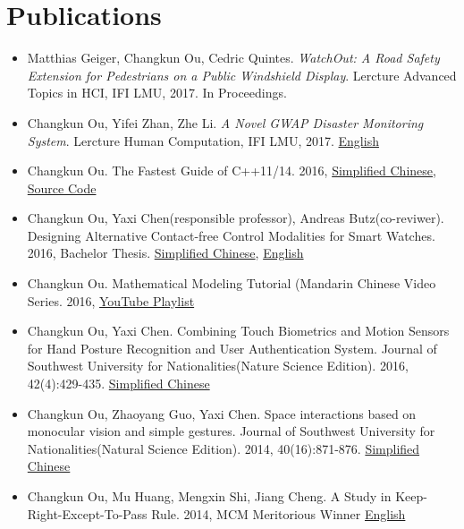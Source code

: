 \documentclass[letterpaper,11pt]{article}
\newcommand{\resumeSubHeadingListStart}{\begin{itemize}[leftmargin=*]}
\newcommand{\resumeSubHeadingListEnd}{\end{itemize}}
\begin{document}
\section{Publications}
 \resumeSubHeadingListStart
    \item{
      Matthias Geiger, Changkun Ou, Cedric Quintes.
      \emph{WatchOut: A Road Safety Extension for Pedestrians on a Public Windshield Display}.
      Lercture Advanced Topics in HCI, IFI LMU, 2017. In Proceedings.
    }
    \item{
      Changkun Ou, Yifei Zhan, Zhe Li.
      \emph{A Novel GWAP Disaster Monitoring System}.
      Lercture Human Computation, IFI LMU, 2017.
      \href{https://github.com/changkun/hc-ss17-disaster-monitoring/blob/master/report/hc_final_project_report_team_Hotpot.pdf}{English}
    }
   \item{
       Changkun Ou.
       The Fastest Guide of C++11/14. 
       2016, 
       \href{https://www.gitbook.com/book/changkun/cpp1x-tutorial/details}{Simplified Chinese}, 
       \href{https://github.com/changkun/cpp1x-tutorial}{Source Code}
   }
   \item{
       Changkun Ou, Yaxi Chen(responsible professor), Andreas Butz(co-reviwer).
       Designing Alternative Contact-free Control Modalities for Smart Watches. 
       2016, Bachelor Thesis. \href{https://changkun.us/files/cv/bachelor-thesis-cn.html}{Simplified Chinese}, 
       \href{https://changkun.us/files/cv/bachelor-thesis-en.html}{English}
   }
   \item{
       Changkun Ou.
       Mathematical Modeling Tutorial (Mandarin Chinese Video Series.
       2016, \href{https://www.youtube.com/watch?v=EUfXE3vP9_A&list=PLwUqqMt5en7c7iZIseCVAS5BX6RPkS-qR}{YouTube Playlist}
   }
   \item{
       Changkun Ou, Yaxi Chen. 
       Combining Touch Biometrics and Motion Sensors for Hand Posture Recognition and User Authentication System. 
       Journal of Southwest University for Nationalities(Nature Science Edition). 
       2016, 42(4):429-435. \href{https://changkun.us/files/cv/touch.swun.html}{Simplified Chinese}
   }
   \item{
       Changkun Ou, Zhaoyang Guo, Yaxi Chen.
       Space interactions based on monocular vision and simple gestures. 
       Journal of Southwest University for Nationalities(Natural Science Edition). 
       2014, 40(16):871-876. \href{https://changkun.us/files/cv/vision.swun.html}{Simplified Chinese}
   }
   \item{
       Changkun Ou, Mu Huang, Mengxin Shi, Jiang Cheng. 
       A Study in Keep-Right-Except-To-Pass Rule. 
       2014, MCM Meritorious Winner \href{https://changkun.us/files/cv/28922.public.html}{English}
   }
 \resumeSubHeadingListEnd
\end{document}
